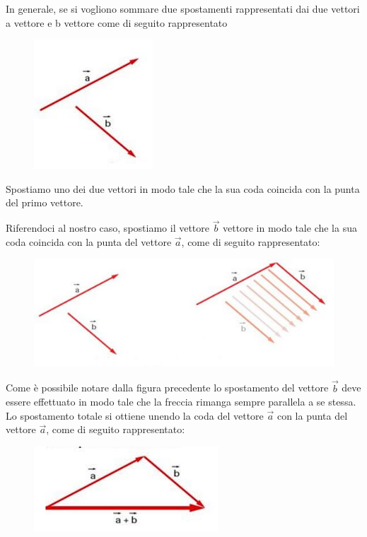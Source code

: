 \documentclass[12pt,oneside]{book}
\begin{document}
In generale, se si vogliono sommare due spostamenti rappresentati dai due vettori a vettore e b vettore come di seguito rappresentato
\begin{figure}[h]
    \includegraphics[scale=0.5]{vettori_da_sommare}
    \centering
\end{figure}

Spostiamo uno dei due vettori in modo tale che la sua coda coincida con la punta del primo vettore.

Riferendoci al nostro caso, spostiamo il vettore $\vec{b}$ vettore in modo tale che la sua coda coincida con la
punta del vettore $\vec{a}$, come di seguito rappresentato:
\begin{figure}[h]
    \includegraphics[scale=0.5]{punta_coda}
    \centering
\end{figure}

Come è possibile notare dalla figura precedente lo spostamento del vettore $\vec{b}$ deve essere effettuato in modo
tale che la freccia rimanga sempre parallela a se stessa.
Lo spostamento totale si ottiene unendo la coda del vettore $\vec{a}$ con la punta del vettore $\vec{a}$, come di seguito
rappresentato:
\begin{figure}[h]
    \includegraphics[scale=0.5]{vettori_sommati}
    \centering
\end{figure}
\end{document}
